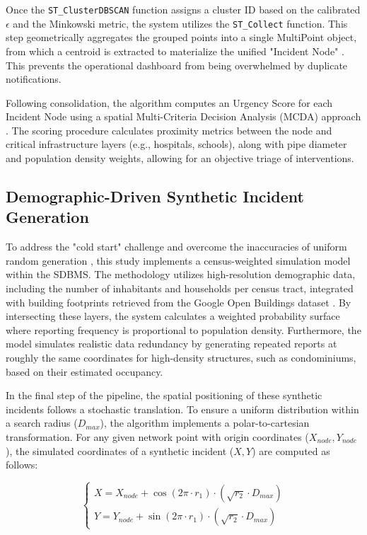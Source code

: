 \documentclass[conference]{IEEEtran}
\renewcommand\hl[1]{#1}
\begin{document}
Once the \texttt{ST\_ClusterDBSCAN} function assigns a cluster ID based on the calibrated $\epsilon$ and the Minkowski metric, the system utilizes the \texttt{ST\_Collect} function. This step geometrically aggregates the grouped points into a single MultiPoint object, from which a centroid is extracted to materialize the unified "Incident Node" \cite{dealbuquerque2015}. This prevents the operational dashboard from being overwhelmed by duplicate notifications.

Following consolidation, the algorithm computes an Urgency Score for each Incident Node using a spatial Multi-Criteria Decision Analysis (MCDA) approach \cite{zyoud2016}. The scoring procedure calculates proximity metrics between the node and critical infrastructure layers (e.g., hospitals, schools), along with pipe diameter and population density weights, allowing for an objective triage of interventions.

\subsection{Demographic-Driven Synthetic Incident Generation} \label{sub:demographic-driven-synthetic-incident-generation}

To address the "cold start" challenge and overcome the inaccuracies of uniform random generation \cite{mcalinden2024}, this study implements a census-weighted simulation model within the SDBMS. The methodology utilizes high-resolution demographic data, including the number of inhabitants and households per census tract, integrated with building footprints retrieved from the Google Open Buildings dataset \cite{sirko2021}. By intersecting these layers, the system calculates a weighted probability surface where reporting frequency is proportional to population density. Furthermore, the model simulates realistic data redundancy by generating repeated reports at roughly the same coordinates for high-density structures, such as condominiums, based on their estimated occupancy.

In the final step of the pipeline, the spatial positioning of these synthetic incidents follows a stochastic translation. To ensure a uniform distribution within a search radius ($D_{max}$), the algorithm implements a polar-to-cartesian transformation. For any given network point \hl{with origin coordinates ($X_{node}, Y_{node}$)}, the \hl{simulated} coordinates of a synthetic incident ($X, Y$) are computed as follows:

\begin{equation}
	\begin{cases} 
		X = X_{node} + \cos(2\pi \cdot r_1) \cdot (\sqrt{r_2} \cdot D_{max}) \\
		Y = Y_{node} + \sin(2\pi \cdot r_1) \cdot (\sqrt{r_2} \cdot D_{max})
	\end{cases}
	\label{eq:translation}
\end{equation}
\end{document}

